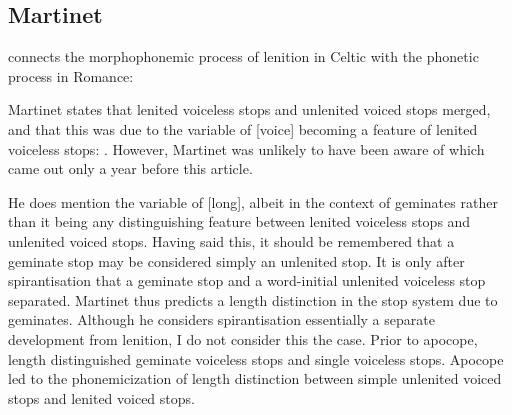 \subsection{Martinet}

\Textcite{martinet_celtic_1952} connects the morphophonemic process of lenition in Celtic with the phonetic process in Romance: 

Martinet states that lenited voiceless stops and unlenited voiced stops merged, and that this was due to the variable of [voice] becoming a feature of lenited voiceless stops:
.
However, Martinet was unlikely to have been aware of \textcite{falchun_systeme_1951} which came out only a year before this article.

He does mention the variable of [long], albeit in the context of geminates rather than it being any distinguishing feature between lenited voiceless stops and unlenited voiced stops. Having said this, it should be remembered that a geminate stop may be considered simply an unlenited stop. It is only after spirantisation that a geminate stop and a word-initial unlenited voiceless stop separated.
Martinet thus predicts a length distinction in the stop system due to geminates. Although he considers spirantisation essentially a separate development from lenition, I do not consider this the case. Prior to apocope, length distinguished geminate voiceless stops and single voiceless stops. Apocope led to the phonemicization of length distinction between simple unlenited voiced stops and lenited voiced stops. 

